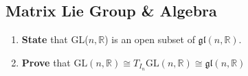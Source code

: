 \documentclass[prb,12pt]{revtex4-2}
\theoremstyle{definition}
\theoremstyle{definition}
\newcommand{\R}{\mathbb{R}}
\begin{document}
\subsection{Matrix Lie Group \& Algebra}
\begin{enumerate}[resume]
	\item \textbf{State} that GL($n, \R$) is an open subset of $\mathfrak{gl}(n, \R)$.
	\item \textbf{Prove} that $\text{GL}(n, \R)\cong T_{I_n}\text{GL}(n, \R)\cong \mathfrak{gl}(n, \R)$
\end{enumerate}
\end{document}
